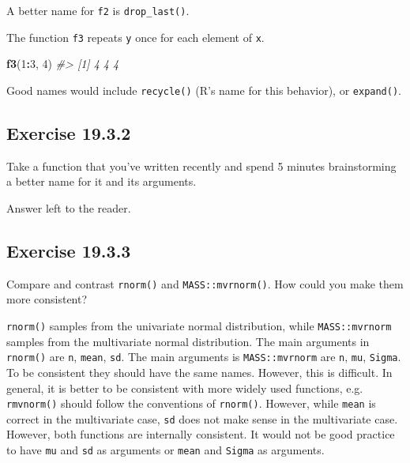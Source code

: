 \documentclass[]{book}
\newenvironment{Shaded}{\begin{snugshade}}{\end{snugshade}}
\newcommand{\CommentTok}[1]{\textcolor[rgb]{0.56,0.35,0.01}{\textit{#1}}}
\newcommand{\DecValTok}[1]{\textcolor[rgb]{0.00,0.00,0.81}{#1}}
\newcommand{\KeywordTok}[1]{\textcolor[rgb]{0.13,0.29,0.53}{\textbf{#1}}}
\newcommand{\NormalTok}[1]{#1}
\newcommand{\OperatorTok}[1]{\textcolor[rgb]{0.81,0.36,0.00}{\textbf{#1}}}
\theoremstyle{plain}
\theoremstyle{remark}
\theoremstyle{definition}
\theoremstyle{definition}
\theoremstyle{definition}
\theoremstyle{remark}
\begin{document}
A better name for \texttt{f2} is \texttt{drop\_last()}.

The function \texttt{f3} repeats \texttt{y} once for each element of
\texttt{x}.

\begin{Shaded}
\begin{Highlighting}[]
\KeywordTok{f3}\NormalTok{(}\DecValTok{1}\OperatorTok{:}\DecValTok{3}\NormalTok{, }\DecValTok{4}\NormalTok{)}
\CommentTok{#> [1] 4 4 4}
\end{Highlighting}
\end{Shaded}

Good names would include \texttt{recycle()} (R's name for this
behavior), or \texttt{expand()}.

\hypertarget{exercise-19.3.2}{%
\subsection*{\texorpdfstring{Exercise
{19.3.2}}{Exercise 19.3.2}}\label{exercise-19.3.2}}

Take a function that you've written recently and spend 5 minutes
brainstorming a better name for it and its arguments.

Answer left to the reader.

\hypertarget{exercise-19.3.3}{%
\subsection*{\texorpdfstring{Exercise
{19.3.3}}{Exercise 19.3.3}}\label{exercise-19.3.3}}

Compare and contrast \texttt{rnorm()} and \texttt{MASS::mvrnorm()}. How
could you make them more consistent?

\texttt{rnorm()} samples from the univariate normal distribution, while
\texttt{MASS::mvrnorm} samples from the multivariate normal
distribution. The main arguments in \texttt{rnorm()} are \texttt{n},
\texttt{mean}, \texttt{sd}. The main arguments is \texttt{MASS::mvrnorm}
are \texttt{n}, \texttt{mu}, \texttt{Sigma}. To be consistent they
should have the same names. However, this is difficult. In general, it
is better to be consistent with more widely used functions, e.g.
\texttt{rmvnorm()} should follow the conventions of \texttt{rnorm()}.
However, while \texttt{mean} is correct in the multivariate case,
\texttt{sd} does not make sense in the multivariate case. However, both
functions are internally consistent. It would not be good practice to
have \texttt{mu} and \texttt{sd} as arguments or \texttt{mean} and
\texttt{Sigma} as arguments.
\end{document}
